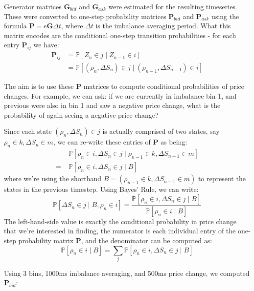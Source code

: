 \documentclass[12pt]{article}
\newcommand\mat[1]{\boldsymbol{#1}}
\begin{document}
Generator matrices $\mat{G}_{bid}$ and $\mat{G}_{ask}$ were estimated for the resulting timeseries. These were converted to one-step probability matrices $\mat{P}_{bid}$ and $\mat{P}_{ask}$ using the formula $\mat{P} = e{\mat{G}\Delta t}$, where $\Delta t$ is the imbalance averaging period. What this matrix encodes are the conditional one-step transition probabilities - for each entry $\mat{P}_{ij}$ we have:
\begin{align*}
\mat{P}_{ij} & = \mathbb{P} \left[Z_n \in j \; | \; Z_{n-1} \in i \right] \\
&= \mathbb{P}\left[(\rho_n, \Delta S_n) \in j \; | \; (\rho_{n-1}, \Delta S_{n-1}) \in i \right]
\end{align*}

The aim is to use these $\mat{P}$ matrices to compute conditional probabilities of price changes. For example, we can ask: if we are currently in imbalance bin 1, and previous were also in bin 1 and saw a negative price change, what is the probability of again seeing a negative price change?

Since each state $(\rho_n, \Delta S_n) \in j$ is actually comprised of two states, say $\rho_n \in k, \Delta S_n \in m$, we can re-write these entries of $\mat{P}$ as being:
\begin{align*}
& \mathbb{P}\left[ \rho_n \in i, \Delta S_n \in j \; | \; \rho_{n-1} \in k, \Delta S_{n-1} \in m \right] \\
=\;  & \mathbb{P}\left[ \rho_n \in i, \Delta S_n \in j \; | \; B \right]
\end{align*}
where we're using the shorthand $B = (\rho_{n-1} \in k, \Delta S_{n-1} \in m)$ to represent the states in the previous timestep. Using Bayes' Rule, we can write:
$$ \mathbb{P}\left[ \Delta S_n \in j \; | \; B, \rho_n \in i \right] = \dfrac{\mathbb{P}\left[ \rho_n \in i, \Delta S_n \in j \; | \; B \right]}{\mathbb{P}\left[ \rho_n \in i \; | \; B \right]} $$
The left-hand-side value is exactly the conditional probability in price change that we're interested in finding, the numerator is each individual entry of the one-step probability matrix $\mat{P}$, and the denominator can be computed as:
$$\mathbb{P}\left[ \rho_n \in i \; | \; B \right] = \sum\limits_j \mathbb{P}\left[ \rho_n \in i,  \Delta S_n \in j \; | \; B \right]$$

Using 3 bins, 1000ms imbalance averaging, and 500ms price change, we computed $\mat{P}_{bid}$:
\end{document}
